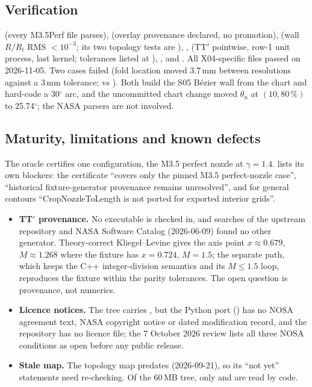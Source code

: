 \subsection{Verification}

 (every M3.5Perf file parses),  (overlay provenance declared, no promotion),  (wall $R/R_t$ RMS $<10^{-3}$; its two topology tests are ), ,  (TT$'$ pointwise, row-1 unit process, last kernel; tolerances listed at ), ,  and . All X04-specific files passed on 2026-11-05. Two  cases failed (fold location moved 3.7\,mm between resolutions against a 3\,mm tolerance;  vs ). Both build the S05 B\'ezier wall from the chart and hard-code a 30$^\circ$ arc, and the uncommitted chart change moved $\theta_n$ at $(10,80\,\%)$ to 25.74$^\circ$; the NASA parsers are not involved.

\subsection{Maturity, limitations and known defects}

The oracle certifies one configuration, the M3.5 perfect nozzle at $\gamma=1.4$.  lists its own blockers: the certificate ``covers only the pinned M3.5 perfect-nozzle case'', ``historical fixture-generator provenance remains unresolved'', and for general contours ``CropNozzleToLength is not ported for exported interior grids''.
\begin{itemize}
\item \textbf{TT$'$ provenance.} No executable is checked in, and searches of the upstream repository and NASA Software Catalog (2026-06-09) found no other generator. Theory-correct Kliegel--Levine gives the axis point $x\approx0.679$, $M\approx1.268$ where the fixture has $x=0.724$, $M=1.5$; the separate  path, which keeps the C++ integer-division semantics and its $M\le1.5$ loop, reproduces the fixture within the parity tolerances. The open question is provenance, not numerics.
\item \textbf{Licence notices.} The tree carries , but the Python port () has no NOSA agreement text, NASA copyright notice or dated modification record, and the repository has no licence file; the 7 October 2026 review lists all three NOSA conditions as open before any public release.
\item \textbf{Stale map.} The topology map predates  (2026-09-21), so its ``not yet'' statements need re-checking. Of the 60\,MB tree, only  and  are read by code.
\end{itemize}

